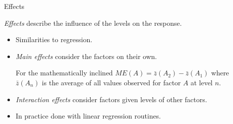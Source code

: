 \documentclass[english,usenames,dvipsnames,aspectratio=169]{beamer}
\begin{document}
\begin{frame}{Effects}

\Large
\emph{Effects} describe the influence of the levels on the response.
\normalsize

\begin{itemize}
\item Similarities to regression.
\item \emph{Main effects} consider the factors on their own.
\begin{block}{For the mathematically inclined}
  $ME(A) = \bar{z}(A_2) - \bar{z}(A_1)$ where $\bar{z}(A_n)$ is the
  average of all values observed for factor $A$ at level $n$.
\end{block}



\item \emph{Interaction effects} consider factors given levels of
  other factors.
\item In practice done with linear regression routines.
\end{itemize}

\end{frame}

\end{document}
